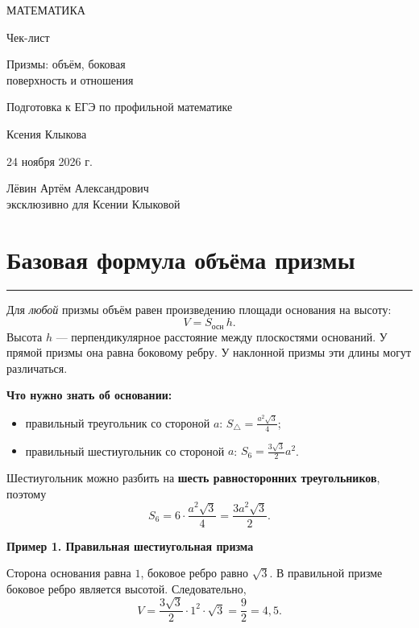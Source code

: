 \documentclass[a4paper,12pt]{article}
\newcommand{\topic}[1]{\needspace{6\baselineskip}\section{#1}\vspace{-1.5mm}\noindent\textcolor{accent}{\rule{\linewidth}{0.45pt}}\vspace{-2mm}}
\newcommand{\key}[1]{\textcolor{darkaccent}{\textbf{#1}}}
\newcommand{\ex}[1]{\par\medskip\noindent\textcolor{darkaccent}{\textbf{#1}}\par\smallskip}
\begin{document}
\thispagestyle{empty}
\begin{center}
\vspace*{20mm}
{\large\color{darkaccent} МАТЕМАТИКА}\par
\vspace{20mm}
{\LARGE\color{textgray} Чек-лист}\par
\vspace{15mm}
{\LARGE\color{accent} Призмы: объём, боковая\\[2mm] поверхность и отношения}\par
\vspace{17mm}
{\normalsize Подготовка к ЕГЭ по профильной математике}\par
\vfill
{\large Ксения Клыкова}\par
\vspace{15mm}
{\normalsize 24 ноября 2026 г.}\par
\vspace{16mm}
{\small Лёвин Артём Александрович\\[1.5mm]эксклюзивно для Ксении Клыковой}\par
\vspace{10mm}
\vspace*{3mm}
\end{center}
\clearpage

\topic{Базовая формула объёма призмы}
Для \emph{любой} призмы объём равен произведению площади основания на высоту:
\[
\boxed{V=S_{\text{осн}}\,h}.
\]
Высота $h$ --- перпендикулярное расстояние между плоскостями оснований. У прямой призмы она равна боковому ребру. У наклонной призмы эти длины могут различаться.

\key{Что нужно знать об основании:}
\begin{itemize}
\item правильный треугольник со стороной $a$: \(\displaystyle S_{\triangle}=\frac{a^2\sqrt3}{4}\);
\item правильный шестиугольник со стороной $a$: \(\displaystyle S_{6}=\frac{3\sqrt3}{2}a^2\).
\end{itemize}
Шестиугольник можно разбить на \textbf{шесть равносторонних треугольников}, поэтому
\[
S_6=6\cdot\frac{a^2\sqrt3}{4}=\frac{3a^2\sqrt3}{2}.
\]

\ex{Пример 1. Правильная шестиугольная призма}
Сторона основания равна $1$, боковое ребро равно $\sqrt3$. В правильной призме боковое ребро является высотой. Следовательно,
\[
V=\frac{3\sqrt3}{2}\cdot 1^2\cdot\sqrt3
=\frac{9}{2}=4{,}5.
\]
\end{document}
